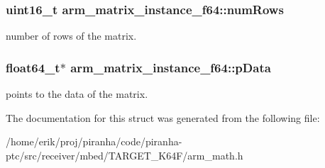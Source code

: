 \subsubsection[{\texorpdfstring{num\+Rows}{numRows}}]{\setlength{\rightskip}{0pt plus 5cm}uint16\+\_\+t arm\+\_\+matrix\+\_\+instance\+\_\+f64\+::num\+Rows}\hypertarget{structarm__matrix__instance__f64_a8b44d1e5003345047c4ead9e1593bf22}{}\label{structarm__matrix__instance__f64_a8b44d1e5003345047c4ead9e1593bf22}
number of rows of the matrix. 
\subsubsection[{\texorpdfstring{p\+Data}{pData}}]{\setlength{\rightskip}{0pt plus 5cm}float64\+\_\+t$\ast$ arm\+\_\+matrix\+\_\+instance\+\_\+f64\+::p\+Data}\hypertarget{structarm__matrix__instance__f64_a5b2475f8ff1e4818955cdd18bc40a097}{}\label{structarm__matrix__instance__f64_a5b2475f8ff1e4818955cdd18bc40a097}
points to the data of the matrix. 

The documentation for this struct was generated from the following file\+:\begin{DoxyCompactItemize}
\item 
/home/erik/proj/piranha/code/piranha-\/ptc/src/receiver/mbed/\+T\+A\+R\+G\+E\+T\+\_\+\+K64\+F/arm\+\_\+math.\+h\end{DoxyCompactItemize}
